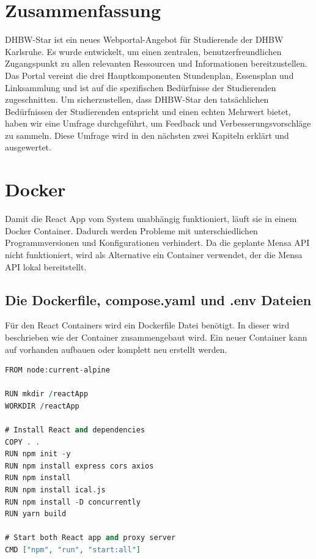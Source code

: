 \section{Zusammenfassung}
DHBW-Star ist ein  neues Webportal-Angebot für Studierende der DHBW Karlsruhe. Es wurde  entwickelt, um einen zentralen, benutzerfreundlichen Zugangspunkt zu allen relevanten Ressourcen und Informationen bereitzustellen. Das Portal vereint die drei Hauptkomponenten Stundenplan, Essensplan und Linksammlung und ist auf die spezifischen Bedürfnisse der Studierenden zugeschnitten. 
Um sicherzustellen, dass DHBW-Star den tatsächlichen Bedürfnissen der Studierenden entspricht und einen echten Mehrwert bietet, haben wir eine Umfrage durchgeführt, um Feedback und Verbesserungsvorschläge zu sammeln.
Diese Umfrage wird in den nächsten zwei Kapiteln erklärt und ausgewertet.
\newpage
\section{Docker}

Damit die React App vom System unabhängig funktioniert, läuft sie in einem Docker Container. Dadurch werden Probleme mit unterschiedlichen Programmversionen und Konfigurationen verhindert.
Da die geplante Mensa API nicht funktioniert, wird als Alternative ein Container verwendet, der die Mensa API lokal bereitstellt.

\subsection{Die Dockerfile, compose.yaml und .env Dateien}

Für den React Containers wird ein Dockerfile Datei benötigt. In dieser wird beschrieben wie der Container zusammengebaut wird. Ein neuer Container kann auf vorhanden aufbauen oder komplett neu erstellt werden.

\begin{lstlisting}[language=vhdl,
	frame=single,           % Ein Rahmen um den Code
	framexleftmargin=15pt,  % Rahmen link von den Zahlen
	style=algoBericht,
	label={Dockerfile},
	captionpos=b           % Caption unter den Code setzen
	caption={Dockerfile für DHBW-Star}]
FROM node:current-alpine

RUN mkdir /reactApp
WORKDIR /reactApp

# Install React and dependencies
COPY . .
RUN npm init -y
RUN npm install express cors axios
RUN npm install
RUN npm install ical.js
RUN npm install -D concurrently
RUN yarn build

# Start both React app and proxy server
CMD ["npm", "run", "start:all"]
\end{lstlisting}

